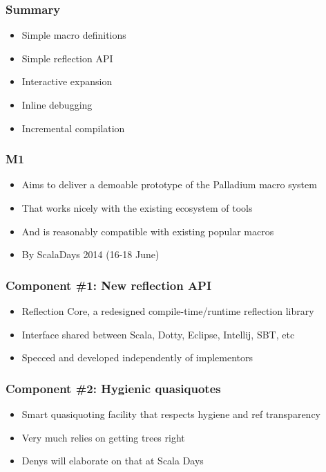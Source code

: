 \documentclass[svgnames,dvipsnames,hyperref={bookmarks=false}]{beamer}
\begin{document}
\begin{frame}[fragile]
\frametitle{Summary}

\begin{itemize}
\item Simple macro definitions
\item Simple reflection API
\item Interactive expansion
\item Inline debugging
\item Incremental compilation
\end{itemize}
\end{frame}

\begin{frame}[fragile]
\frametitle{}

\vskip40pt
\begin{center}
\end{center}
\end{frame}

\begin{frame}[fragile]
\frametitle{M1}

\begin{itemize}
\item Aims to deliver a demoable prototype of the Palladium macro system
\item That works nicely with the existing ecosystem of tools
\item And is reasonably compatible with existing popular macros
\item By ScalaDays 2014 (16-18 June)
\end{itemize}
\end{frame}

\begin{frame}[fragile]
\frametitle{Component \#1: New reflection API}

\begin{itemize}
\item Reflection Core, a redesigned compile-time/runtime reflection library
\item Interface shared between Scala, Dotty, Eclipse, Intellij, SBT, etc
\item Specced and developed independently of implementors
\end{itemize}
\end{frame}

\begin{frame}[fragile]
\frametitle{Component \#2: Hygienic quasiquotes}

\begin{itemize}
\item Smart quasiquoting facility that respects hygiene and ref transparency
\item Very much relies on getting trees right
\item Denys will elaborate on that at Scala Days
\end{itemize}
\end{frame}
\end{document}
